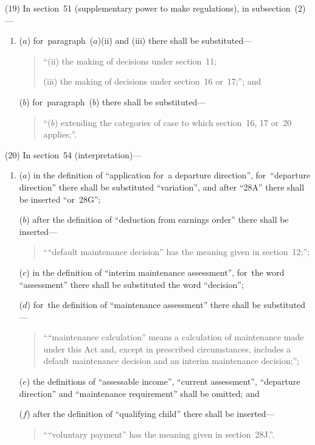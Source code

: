 \documentclass[12pt,a4paper]{article}
\begin{document}
(19) In section~51 (supplementary power to make regulations), in subsection~(2)—
\begin{enumerate}\item[]
($a$) for~paragraph~($a$)(ii)  and (iii)  there shall be substituted—
\begin{quotation}
“(ii) the making of decisions under section~11;

(iii) the making of decisions under section~16 or~17;”; and
\end{quotation}

($b$) for~paragraph~($b$)  there shall be substituted—
\begin{quotation}
“($b$) extending the categories of case to which section~16, 17 or~20 applies;”.
\end{quotation}
\end{enumerate}

(20) In section~54 (interpretation)—
\begin{enumerate}\item[]
($a$) in the definition of “application for~a departure direction”, for~“departure direction” there shall be substituted “variation”, and after “28A” there shall be inserted “or~28G”;

($b$) after the definition of “deduction from earnings order” there shall be inserted—
\begin{quotation}
““default maintenance decision” has the meaning given in section~12;”;
\end{quotation}

($c$) in the definition of “interim maintenance assessment”, for~the word “assessment” there shall be substituted the word “decision”;

($d$) for~the definition of “maintenance assessment” there shall be substituted—
\begin{quotation}
\begin{sloppypar}
““maintenance calculation” means a calculation of maintenance made under this Act and, except in prescribed circumstances, includes a default maintenance decision and an interim maintenance decision;”;
\end{sloppypar}
\end{quotation}

($e$) the definitions of “assessable income”, “current assessment”, “departure direction” and “maintenance requirement” shall be omitted; and

($f$) after the definition of “qualifying child” there shall be inserted—
\begin{quotation}
\begin{sloppypar}
““voluntary payment” has the meaning given in section~28J.”.
\end{sloppypar}
\end{quotation}
\end{enumerate}
\end{document}
